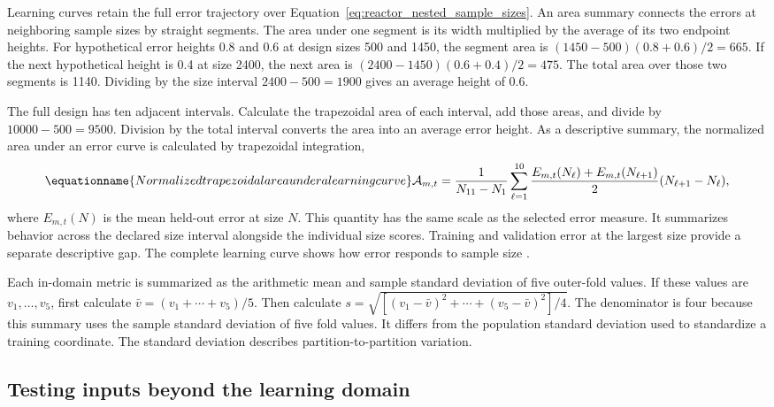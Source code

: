 Learning curves retain the full error trajectory over Equation~\eqref{eq:reactor_nested_sample_sizes}. An area summary connects the errors at neighboring sample sizes by straight segments. The area under one segment is its width multiplied by the average of its two endpoint heights. For hypothetical error heights 0.8 and 0.6 at design sizes 500 and 1450, the segment area is $(1450-500)(0.8+0.6)/2=665$. If the next hypothetical height is 0.4 at size 2400, the next area is $(2400-1450)(0.6+0.4)/2=475$. The total area over those two segments is 1140. Dividing by the size interval $2400-500=1900$ gives an average height of 0.6.

The full design has ten adjacent intervals. Calculate the trapezoidal area of each interval, add those areas, and divide by $10000-500=9500$. Division by the total interval converts the area into an average error height. As a descriptive summary, the normalized area under an error curve is calculated by trapezoidal integration,
\begin{equation}
\equationname{Normalized trapezoidal area under a learning curve}
\mathcal{A}_{m,t}=
\frac{1}{N_{11}-N_1}
\sum_{\ell=1}^{10}\frac{E_{m,t}(N_\ell)+E_{m,t}(N_{\ell+1})}{2}
(N_{\ell+1}-N_\ell),
\label{eq:projection_learning_curve_area}
\end{equation}
where $E_{m,t}(N)$ is the mean held-out error at size $N$. This quantity has the same scale as the selected error measure. It summarizes behavior across the declared size interval alongside the individual size scores. Training and validation error at the largest size provide a separate descriptive gap. The complete learning curve shows how error responds to sample size \citep{VieringLoog2023}.

Each in-domain metric is summarized as the arithmetic mean and sample standard deviation of five outer-fold values. If these values are $v_1,\ldots,v_5$, first calculate $\bar v=(v_1+\cdots+v_5)/5$. Then calculate $s=\sqrt{[(v_1-\bar v)^2+\cdots+(v_5-\bar v)^2]/4}$. The denominator is four because this summary uses the sample standard deviation of five fold values. It differs from the population standard deviation used to standardize a training coordinate. The standard deviation describes partition-to-partition variation.

\subsection{Testing inputs beyond the learning domain}


